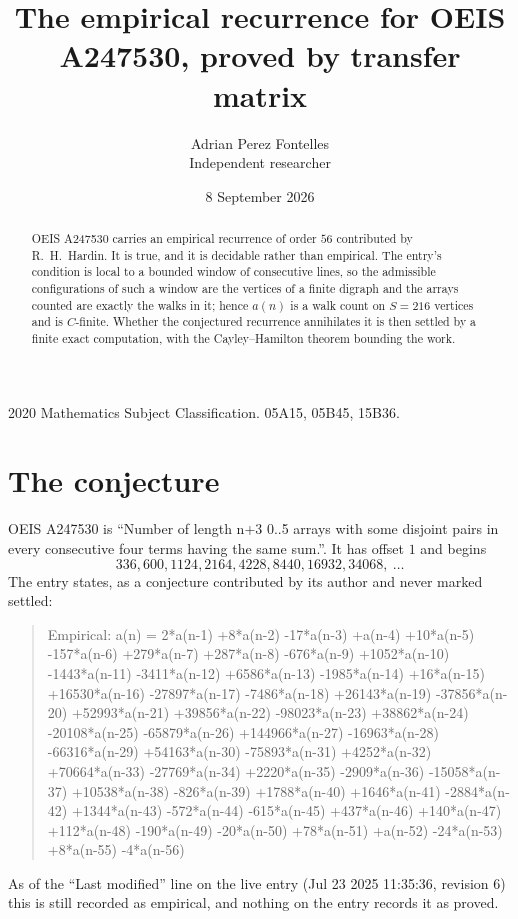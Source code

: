 \documentclass[11pt,a4paper]{article}
\title{The empirical recurrence for OEIS A247530, proved by transfer matrix}
\author{Adrian Perez Fontelles\\ \small Independent researcher}
\date{8 September 2026}
\theoremstyle{plain}
\theoremstyle{definition}
\begin{document}
\maketitle

\begin{abstract}
OEIS A247530 carries an empirical recurrence of order $56$ contributed by R.~H.~Hardin. It is
true, and it is decidable rather than empirical. The entry's condition is local to a bounded window of consecutive lines, so
the admissible configurations of such a window are the vertices of a finite digraph and the
arrays counted are exactly the walks in it; hence $a(n)$ is a walk count on $S=216$ vertices
and is $C$-finite. Whether the conjectured recurrence annihilates it is then settled by a
finite exact computation, with the Cayley--Hamilton theorem bounding the work.
\end{abstract}

\noindent\small 2020 Mathematics Subject Classification. 05A15, 05B45, 15B36.\normalsize

\section{The conjecture}

OEIS A247530 is ``Number of length n+3 0..5 arrays with some disjoint pairs in every consecutive four terms having the same sum.''. It has offset $1$ and begins
\[
336, 600, 1124, 2164, 4228, 8440, 16932, 34068,\ \dots
\]
The entry states, as a conjecture contributed by its author and never marked settled:
\begin{quote}
Empirical: a(n) = 2*a(n-1) +8*a(n-2) -17*a(n-3) +a(n-4) +10*a(n-5) -157*a(n-6) +279*a(n-7) +287*a(n-8) -676*a(n-9) +1052*a(n-10) -1443*a(n-11) -3411*a(n-12) +6586*a(n-13) -1985*a(n-14) +16*a(n-15) +16530*a(n-16) -27897*a(n-17) -7486*a(n-18) +26143*a(n-19) -37856*a(n-20) +52993*a(n-21) +39856*a(n-22) -98023*a(n-23) +38862*a(n-24) -20108*a(n-25) -65879*a(n-26) +144966*a(n-27) -16963*a(n-28) -66316*a(n-29) +54163*a(n-30) -75893*a(n-31) +4252*a(n-32) +70664*a(n-33) -27769*a(n-34) +2220*a(n-35) -2909*a(n-36) -15058*a(n-37) +10538*a(n-38) -826*a(n-39) +1788*a(n-40) +1646*a(n-41) -2884*a(n-42) +1344*a(n-43) -572*a(n-44) -615*a(n-45) +437*a(n-46) +140*a(n-47) +112*a(n-48) -190*a(n-49) -20*a(n-50) +78*a(n-51) +a(n-52) -24*a(n-53) +8*a(n-55) -4*a(n-56)
\end{quote}
As of the ``Last modified'' line on the live entry (Jul 23 2025 11:35:36, revision 6) this is still
recorded as empirical, and nothing on the entry records it as proved.
\end{document}
